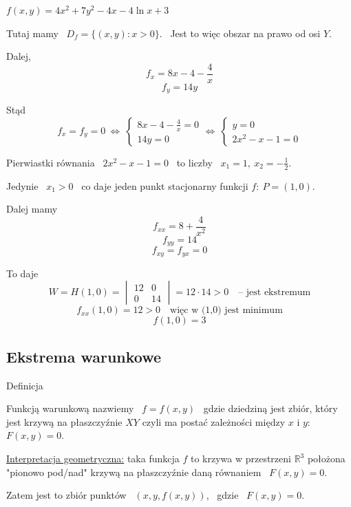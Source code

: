 \begin{przykladbig}
    $ f(x,y) = 4x^2 + 7y^2 - 4x - 4\ln x + 3 $ \medskip

    Tutaj mamy \ $ D_f = \{ (x,y): x > 0 \} $. \ Jest to więc obszar na prawo od osi $Y$.

    Dalej,
    \[ f_x = 8x - 4 - \frac{4}{x} \]
    \[ f_y = 14y \]

    Stąd
    \[ f_x = f_y = 0 \ \Leftrightarrow \ \begin{cases}
        8x - 4 - \frac{4}{x} = 0 \\
        14y = 0
    \end{cases} \Leftrightarrow \ \begin{cases}
        y = 0 \\
        2x^2 - x - 1 = 0
    \end{cases} \]

    Pierwiastki równania \ $ 2x^2 - x - 1 = 0 $ \ to liczby \ $ x_1 = 1, \ x_2 = -\frac{1}{2} $.

    Jedynie \ $ x_1 > 0 $ \ co daje jeden punkt stacjonarny funkcji $f: \ P = (1,0)$.
    
    Dalej mamy
    \[ f_{xx} = 8 + \frac{4}{x^2} \]
    \[ f_{yy} = 14 \]
    \[ f_{xy} = f_{yx} = 0 \]

    To daje
    \[ W = H(1,0) = \begin{vmatrix}
        12 & 0 \\
        0 & 14
    \end{vmatrix} = 12 \cdot 14 > 0 \quad \text{-- jest ekstremum} \]
    \[ f_{xx}(1,0) = 12 > 0 \quad \text{więc w (1,0) jest minimum} \]
    \[ f(1,0) = 3 \]
\end{przykladbig}

\subsection{Ekstrema warunkowe}

\begin{tw}{Definicja}

Funkcją warunkową nazwiemy \ $ f = f(x,y) $ \ gdzie dziedziną jest zbiór, który jest krzywą na płaszczyźnie $XY$ czyli ma postać zależności
między $x$ i $y$: \ $F(x,y) = 0$.
\end{tw}

\underline{Interpretacja geometryczna:} taka funkcja $f$ to krzywa w przestrzeni $ \mathbb{R}^3 $ położona "pionowo pod/nad" krzywą na płaszczyźnie
daną równaniem \ $F(x,y) = 0$.

Zatem jest to zbiór punktów \ $ (x, y, f(x,y)) $, \ gdzie \ $ F(x,y) = 0 $.

